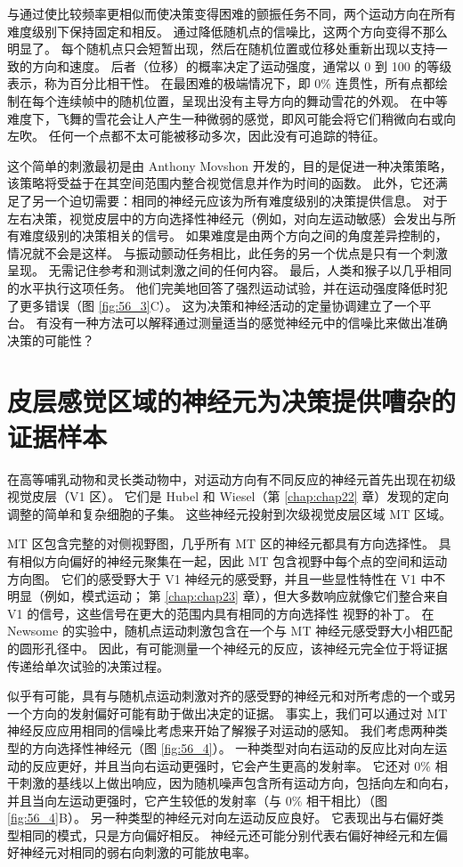 与通过使比较频率更相似而使决策变得困难的颤振任务不同，两个运动方向在所有难度级别下保持固定和相反。
通过降低随机点的信噪比，这两个方向变得不那么明显了。
每个随机点只会短暂出现，然后在随机位置或位移处重新出现以支持一致的方向和速度。
后者（位移）的概率决定了运动强度，通常以 0 到 100 的等级表示，称为百分比相干性。
在最困难的极端情况下，即 0\% 连贯性，所有点都绘制在每个连续帧中的随机位置，呈现出没有主导方向的舞动雪花的外观。
在中等难度下，飞舞的雪花会让人产生一种微弱的感觉，即风可能会将它们稍微向右或向左吹。
任何一个点都不太可能被移动多次，因此没有可追踪的特征。


这个简单的刺激最初是由 Anthony Movshon 开发的，目的是促进一种决策策略，该策略将受益于在其空间范围内整合视觉信息并作为时间的函数。
此外，它还满足了另一个迫切需要：相同的神经元应该为所有难度级别的决策提供信息。
对于左右决策，视觉皮层中的方向选择性神经元（例如，对向左运动敏感）会发出与所有难度级别的决策相关的信号。
如果难度是由两个方向之间的角度差异控制的，情况就不会是这样。
与振动颤动任务相比，此任务的另一个优点是只有一个刺激呈现。
无需记住参考和测试刺激之间的任何内容。
最后，人类和猴子以几乎相同的水平执行这项任务。
他们完美地回答了强烈运动试验，并在运动强度降低时犯了更多错误（图 \ref{fig:56_3}C）。
这为决策和神经活动的定量协调建立了一个平台。
有没有一种方法可以解释通过测量适当的感觉神经元中的信噪比来做出准确决策的可能性？



\section{皮层感觉区域的神经元为决策提供嘈杂的证据样本}

在高等哺乳动物和灵长类动物中，对运动方向有不同反应的神经元首先出现在初级视觉皮层（V1 区）。
它们是 Hubel 和 Wiesel（第 \ref{chap:chap22} 章）发现的定向调整的简单和复杂细胞的子集。
这些神经元投射到次级视觉皮层区域 MT 区域。


MT 区包含完整的对侧视野图，几乎所有 MT 区的神经元都具有方向选择性。
具有相似方向偏好的神经元聚集在一起，因此 MT 包含视野中每个点的空间和运动方向图。
它们的感受野大于 V1 神经元的感受野，并且一些显性特性在 V1 中不明显（例如，模式运动；
第 \ref{chap:chap23} 章），但大多数响应就像它们整合来自 V1 的信号，这些信号在更大的范围内具有相同的方向选择性 视野的补丁。
在 Newsome 的实验中，随机点运动刺激包含在一个与 MT 神经元感受野大小相匹配的圆形孔径中。
因此，有可能测量一个神经元的反应，该神经元完全位于将证据传递给单次试验的决策过程。


似乎有可能，具有与随机点运动刺激对齐的感受野的神经元和对所考虑的一个或另一个方向的发射偏好可能有助于做出决定的证据。
事实上，我们可以通过对 MT 神经反应应用相同的信噪比考虑来开始了解猴子对运动的感知。
我们考虑两种类型的方向选择性神经元（图 \ref{fig:56_4}）。
一种类型对向右运动的反应比对向左运动的反应更好，并且当向右运动更强时，它会产生更高的发射率。
它还对 0\% 相干刺激的基线以上做出响应，因为随机噪声包含所有运动方向，包括向左和向右，并且当向左运动更强时，它产生较低的发射率（与 0\% 相干相比）（图 \ref{fig:56_4}B）。
另一种类型的神经元对向左运动反应良好。
它表现出与右偏好类型相同的模式，只是方向偏好相反。
神经元还可能分别代表右偏好神经元和左偏好神经元对相同的弱右向刺激的可能放电率。


